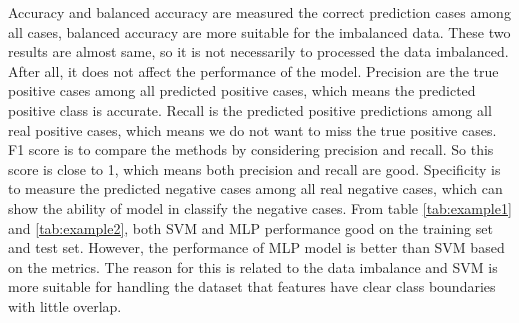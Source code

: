Accuracy and balanced accuracy are measured the correct prediction cases among all cases, balanced accuracy are more suitable for the imbalanced data. These two results are almost same, so it is not necessarily to processed the data imbalanced. After all, it does not affect the performance of the model. 
Precision are the true positive cases among all predicted positive cases, which means the predicted positive class is accurate. 
Recall is the predicted positive predictions among all real positive cases, which means we do not want to miss the true positive cases. 
F1 score is to compare the methods by considering precision and recall. So this score is close to 1, which means both precision and recall are good.   
Specificity is to measure the predicted negative cases among all real negative cases, which can show the ability of model in classify the negative cases. 
From table \ref{tab:example1} and \ref{tab:example2}, both SVM and MLP performance good on the training set and test set. However, the performance of MLP model is better than SVM based on the metrics. The reason for this is related to the data imbalance and SVM is more suitable for handling the dataset that features have clear class boundaries with little overlap.





